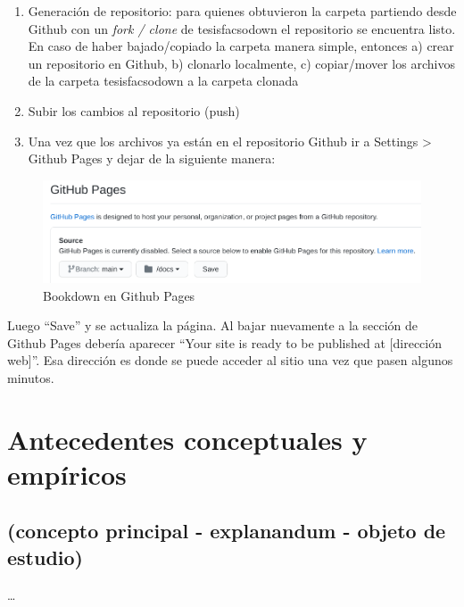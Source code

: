\documentclass[12pt,twoside]{templates/facsothesis}
\begin{document}
\begin{enumerate}
\def\labelenumi{\arabic{enumi}.}
\item
  Generación de repositorio: para quienes obtuvieron la carpeta partiendo desde Github con un \emph{fork / clone} de tesisfacsodown el repositorio se encuentra listo. En caso de haber bajado/copiado la carpeta manera simple, entonces a) crear un repositorio en Github, b) clonarlo localmente, c) copiar/mover los archivos de la carpeta tesisfacsodown a la carpeta clonada
\item
  Subir los cambios al repositorio (push)
\item
  Una vez que los archivos ya están en el repositorio Github ir a Settings \textgreater{} Github Pages y dejar de la siguiente manera:
\end{enumerate}

\begin{figure}

{\centering \includegraphics[width=0.6\linewidth]{images/githubpages} 

}

\caption{Bookdown en Github Pages}\label{fig:githubpages}
\end{figure}

Luego ``Save'' y se actualiza la página. Al bajar nuevamente a la sección de Github Pages debería aparecer ``Your site is ready to be published at {[}dirección web{]}''. Esa dirección es donde se puede acceder al sitio una vez que pasen algunos minutos.

\hypertarget{antecedentes-conceptuales-y-empuxedricos}{%
\chapter{Antecedentes conceptuales y empíricos}\label{antecedentes-conceptuales-y-empuxedricos}}

\hypertarget{concepto-principal---explanandum---objeto-de-estudio}{%
\section{(concepto principal - explanandum - objeto de estudio)}\label{concepto-principal---explanandum---objeto-de-estudio}}

\ldots{}
\end{document}

